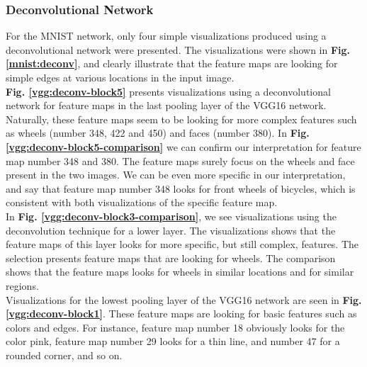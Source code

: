 \begin{comment}
The saliency map indicates to what degree each pixel in the visualization image influences the specific class outcome. The important regions are easily identified by their brightness. The saliency map can help you to see which parts of the visualization image that your network deems more important when deciding upon the classification score chosen.
\end{comment}

\subsubsection{Deconvolutional Network}

For the MNIST network, only four simple visualizations produced using a deconvolutional network were presented. The visualizations were shown in \textbf{Fig. \ref{mnist:deconv}}, and clearly illustrate that the feature maps are looking for simple edges at various locations in the input image. \\

\noindent \textbf{Fig. \ref{vgg:deconv-block5}} presents visualizations using a deconvolutional network for feature maps in the last pooling layer of the VGG16 network. Naturally, these feature maps seem to be looking for more complex features such as wheels (number 348, 422 and 450) and faces (number 380). In \textbf{Fig. \ref{vgg:deconv-block5-comparison}} we can confirm our interpretation for feature map number 348 and 380. The feature maps surely focus on the wheels and face present in the two images. We can be even more specific in our interpretation, and say that feature map number 348 looks for front wheels of bicycles, which is consistent with both visualizations of the specific feature map. \\

\noindent In \textbf{Fig. \ref{vgg:deconv-block3-comparison}}, we see visualizations using the deconvolution technique for a lower layer. The visualizations shows that the feature maps of this layer looks for more specific, but still complex, features. The selection presents feature maps that are looking for wheels. The comparison shows that the feature maps looks for wheels in similar locations and for similar regions. \\

\noindent Visualizations for the lowest pooling layer of the VGG16 network are seen in \textbf{Fig. \ref{vgg:deconv-block1}}. These feature maps are looking for basic features such as colors and edges. For instance, feature map number 18 obviously looks for the color pink, feature map number 29 looks for a thin line, and number 47 for a rounded corner, and so on.

